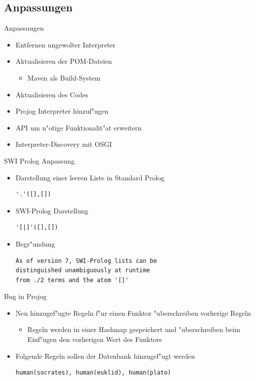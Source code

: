 \documentclass[18pt]{beamer}
\begin{document}
\subsection{Anpassungen}
\begin{frame}{Anpassungen}
\begin{itemize}
\item Entfernen ungewolter Interpreter
\item Aktualisieren der POM-Dateien
\begin{itemize}
\item Maven als Build-System
\end{itemize}
\item Aktualisieren des Codes
\item Projog Interpreter hinzuf"ugen
\item API um n"otige Funktionalit"at erweitern
\item Interpreter-Discovery mit OSGI
\end{itemize}
\end{frame}
\begin{frame}[fragile]{SWI Prolog Anpassung}
\begin{itemize}
\item Darstellung einer leeren Liste in Standard Prolog
\begin{verbatim}
'.'([],[])
\end{verbatim}
\item SWI-Prolog Darstellung
\begin{verbatim}
'[|]'([],[])
\end{verbatim}
\vspace{0.5cm}
\item Begr"undung
\begin{verbatim}
As of version 7, SWI-Prolog lists can be 
distinguished unambiguously at runtime
from ./2 terms and the atom '[]'
\end{verbatim}
\end{itemize}
\end{frame}
\begin{frame}[fragile]{Bug in Projog}
\begin{itemize}
\item Neu hinzugef"ugte Regeln f"ur einen Funktor "uberschreiben vorherige Regeln
\begin{itemize}
\item Regeln werden in einer Hashmap gespeichert und "uberschreiben beim Einf"ugen den vorherigen Wert des Funktors
\end{itemize}
\vspace{0.5cm}
\item Folgende Regeln sollen der Datenbank hinzugef"ugt werden
\begin{verbatim}
human(socrates), human(euklid), human(plato)
\end{verbatim}
\end{itemize}
\end{frame}
\end{document}

